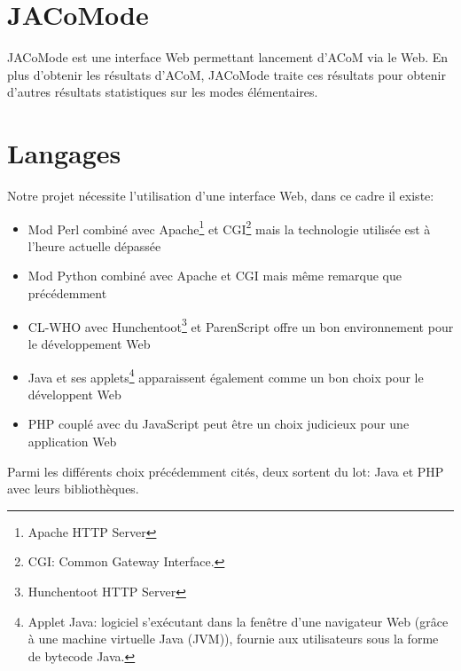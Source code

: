\section{JACoMode}
JACoMode est une interface Web permettant lancement d'ACoM via le Web. En plus d'obtenir les résultats d'ACoM, JACoMode traite ces résultats pour obtenir d'autres résultats statistiques sur les modes élémentaires.

\section{Langages}
Notre projet nécessite l'utilisation d'une interface Web, dans ce cadre il existe:
\begin{itemize}
\item Mod Perl combiné avec Apache\footnote{Apache HTTP Server} et CGI\footnote{CGI: Common Gateway Interface.} mais la technologie utilisée est à l'heure actuelle dépassée
\item Mod Python combiné avec Apache et CGI mais même remarque que précédemment
\item CL-WHO avec Hunchentoot\footnote{Hunchentoot HTTP Server} et ParenScript offre un bon environnement pour le développement Web
\item Java et ses applets\footnote{Applet Java: logiciel s'exécutant dans la fenêtre d'une navigateur Web (grâce à une machine virtuelle Java (JVM)), fournie aux utilisateurs sous la forme de bytecode Java.} apparaissent également comme un bon choix pour le développent Web
\item PHP couplé avec du JavaScript peut être un choix judicieux pour une application Web
\end{itemize}

Parmi les différents choix précédemment cités, deux sortent du lot: Java et PHP avec leurs bibliothèques.